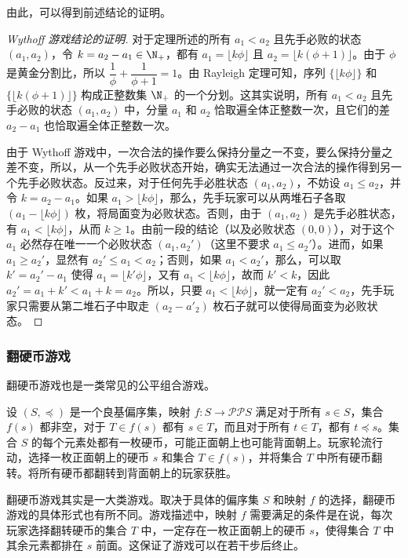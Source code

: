 由此，可以得到前述结论的证明。

\begin{proof}[Wythoff 游戏结论的证明]
	对于定理所述的所有 $a_1 < a_2$ 且先手必败的状态 $(a_1,a_2)$，令 $k = a_2 - a_1 \in\N_+$，都有 $a_1=\lfloor k\phi\rfloor$ 且 $a_2=\lfloor k(\phi+1)\rfloor$。由于 $\phi$ 是黄金分割比，所以 $\dfrac{1}{\phi}+\dfrac{1}{\phi+1}=1$。由 Rayleigh 定理可知，序列 $\{\lfloor k\phi\rfloor\}$ 和 $\{\lfloor k(\phi+1)\rfloor\}$ 构成正整数集 $\N_+$ 的一个分划。这其实说明，所有 $a_1 < a_2$ 且先手必败的状态 $(a_1,a_2)$ 中，分量 $a_1$ 和 $a_2$ 恰取遍全体正整数一次，且它们的差 $a_2-a_1$ 也恰取遍全体正整数一次。
	
	由于 Wythoff 游戏中，一次合法的操作要么保持分量之一不变，要么保持分量之差不变，所以，从一个先手必败状态开始，确实无法通过一次合法的操作得到另一个先手必败状态。反过来，对于任何先手必胜状态 $(a_1,a_2)$，不妨设 $a_1\le a_2$，并令 $k=a_2-a_1$。如果 $a_1>\lfloor k\phi\rfloor$，那么，先手玩家可以从两堆石子各取 $(a_1 - \lfloor k\phi\rfloor)$ 枚，将局面变为必败状态。否则，由于 $(a_1,a_2)$ 是先手必胜状态，有 $a_1 < \lfloor k\phi\rfloor$，从而 $k\ge 1$。由前一段的结论（以及必败状态 $(0,0)$），对于这个 $a_1$ 必然存在唯一一个必败状态 $(a_1,a_2')$（这里不要求 $a_1\le a_2'$）。进而，如果 $a_1 \ge a_2'$，显然有 $a_2' \le a_1 < a_2$；否则，如果 $a_1 < a_2'$，那么，可以取 $k'=a_2'-a_1$ 使得 $a_1=\lfloor k'\phi\rfloor$，又有 $a_1 < \lfloor k\phi\rfloor$，故而 $k' < k$，因此 $a_2'=a_1 + k' < a_1+k = a_2$。所以，只要 $a_1 < \lfloor k\phi\rfloor$，就一定有 $a_2' < a_2$，先手玩家只需要从第二堆石子中取走 $(a_2-a'_2)$ 枚石子就可以使得局面变为必败状态。
\end{proof}

\subsubsection{翻硬币游戏}

翻硬币游戏也是一类常见的公平组合游戏。

\begin{game}[翻硬币]
	设 $(S,\preceq)$ 是一个良基偏序集，映射 $f:S\rightarrow\mathcal{P}\mathcal{P}S$ 满足对于所有 $s\in S$，集合 $f(s)$ 都非空，对于 $T\in f(s)$ 都有 $s\in T$，而且对于所有 $t\in T$，都有 $t\preceq s$。集合 $S$ 的每个元素处都有一枚硬币，可能正面朝上也可能背面朝上。玩家轮流行动，选择一枚正面朝上的硬币 $s$ 和集合 $T\in f(s)$，并将集合 $T$ 中所有硬币翻转。将所有硬币都翻转到背面朝上的玩家获胜。
\end{game}

翻硬币游戏其实是一大类游戏。取决于具体的偏序集 $S$ 和映射 $f$ 的选择，翻硬币游戏的具体形式也有所不同。游戏描述中，映射 $f$ 需要满足的条件是在说，每次玩家选择翻转硬币的集合 $T$ 中，一定存在一枚正面朝上的硬币 $s$，使得集合 $T$ 中其余元素都排在 $s$ 前面。这保证了游戏可以在若干步后终止。

